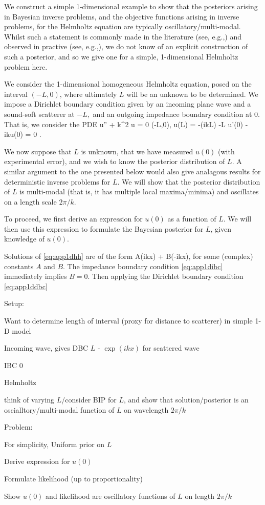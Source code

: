 We construct a simple 1-dimensional example to show that the posteriors arising in Bayesian inverse problems, and the objective functions arising in inverse problems, for the Helmholtz equation are typically oscillatory/multi-modal. Whilst such a statement is commonly made in the literature (see, e.g.,) and observed in practive (see, e.g.,), we do not know of an explicit construction of such a posterior, and so we give one for a simple, 1-dimensional Helmholtz problem here.

We consider the 1-dimensional homogeneous Helmholtz equation, posed on the interval $(-L,0)$, where ultimately $L$ will be an unknown to be determined. We impose a Dirichlet boundary condition given by an incoming plane wave and a sound-soft scatterer at $-L,$ and an outgoing impedance boundary condition at 0. That is, we consider the PDE
\beq\label{eq:app1dhh}
u'' + k^2 u = 0 \tin (-L,0),
\eeq
\beq\label{eq:app1dibc}
u(L) = -\exp(ikL) \tat -L
\eeq
\beq\label{eq:app1ddbc}
u'(0) - iku(0) = 0 .
\eeq

We now suppose that $L$ is unknown, that we have measured $u(0)$ (with experimental error), and we wish to know the posterior distribution of $L$. A similar argument to the one presented below would also give analagous results for deterministic inverse problems for $L$. We will show that the posterior distribution of $L$ is multi-modal (that is, it has multiple local maxima/minima) and oscillates on a length scale $2\pi/k.$

To proceed, we first derive an expression for $u(0)$ as a function of $L$. We will then use this expression to formulate the Bayesian posterior for $L$, given knowledge of $u(0).$

Solutions of \eqref{eq:app1dhh} are of the form
\beqs
A\exp(ikx) + B\exp(-ikx),
\eeqs
for some (complex) constants $A$ and $B$. The impedance boundary condition \eqref{eq:app1dibc} immediately implies $B=0$. Then applying the Dirichlet boundary condition \eqref{eq:app1ddbc}

Setup:
\bit
\item Want to determine length of interval (proxy for distance to scatterer) in simple 1-D model
\item Incoming wave, gives DBC \@ $L$ - $\exp(ikx)$ for scattered wave
\item IBC \@ 0
\item Helmholtz
\item think of varying $L$/consider BIP for $L$, and show that solution/posterior is an oscialltory/multi-modal function of $L$ on wavelength $2\pi/k$  
\eit

Problem:
\bit
\item For simplicity, Uniform prior on $L$
\item Derive expression for $u(0)$
\item Formulate likelihood (up to proportionality)
\item Show $u(0)$ and likelihood are oscillatory functions of $L$ on length $2\pi/k$
\eit
